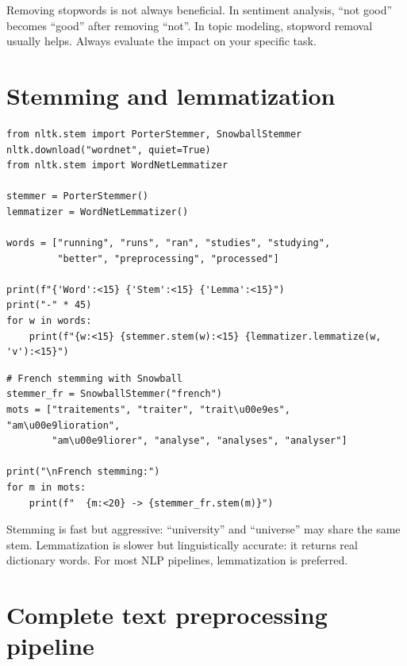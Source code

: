 \begin{warningbox}
Removing stopwords is not always beneficial. In sentiment analysis, ``not good'' becomes ``good'' after removing ``not''. In topic modeling, stopword removal usually helps. Always evaluate the impact on your specific task.
\end{warningbox}

\section{Stemming and lemmatization}

\begin{verbatim}
from nltk.stem import PorterStemmer, SnowballStemmer
nltk.download("wordnet", quiet=True)
from nltk.stem import WordNetLemmatizer

stemmer = PorterStemmer()
lemmatizer = WordNetLemmatizer()

words = ["running", "runs", "ran", "studies", "studying",
         "better", "preprocessing", "processed"]

print(f"{'Word':<15} {'Stem':<15} {'Lemma':<15}")
print("-" * 45)
for w in words:
    print(f"{w:<15} {stemmer.stem(w):<15} {lemmatizer.lemmatize(w, 'v'):<15}")
\end{verbatim}

\begin{verbatim}
# French stemming with Snowball
stemmer_fr = SnowballStemmer("french")
mots = ["traitements", "traiter", "trait\u00e9es", "am\u00e9lioration",
        "am\u00e9liorer", "analyse", "analyses", "analyser"]

print("\nFrench stemming:")
for m in mots:
    print(f"  {m:<20} -> {stemmer_fr.stem(m)}")
\end{verbatim}

\begin{preprocesstip}
Stemming is fast but aggressive: ``university'' and ``universe'' may share the same stem. Lemmatization is slower but linguistically accurate: it returns real dictionary words. For most NLP pipelines, lemmatization is preferred.
\end{preprocesstip}

\section{Complete text preprocessing pipeline}

